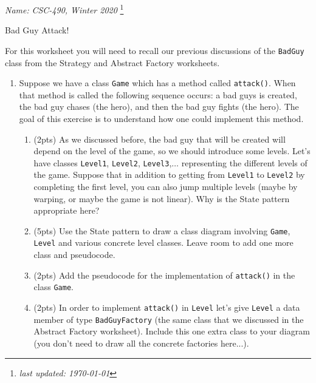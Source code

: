 \documentclass[11pt]{article}
\newlength{\up}\setlength{\up}{-\baselineskip}
\newcommand\blfootnote[1]{%
  \begingroup
  \renewcommand\thefootnote{}\footnote{#1}%
  \addtocounter{footnote}{-1}%
  \endgroup
}
\begin{document}
\noindent\emph{Name:}
\hfill
\emph{CSC-490, Winter 2020}
\blfootnote{\emph{last updated: \today}}

\vspace{-0.4in}

\begin{center}
  {\huge Bad Guy Attack!}
\end{center}

\medskip



For this worksheet you will need to recall our previous discussions of the \texttt{BadGuy} class from the Strategy and Abstract Factory worksheets. 

\begin{enumerate}

  \item Suppose we have a class \texttt{Game} which has a method called \texttt{attack()}. When that method is called the following sequence occurs: a bad guys is created, the bad guy chases (the hero), and then the bad guy fights (the hero). The goal of this exercise is to understand how one could implement this method.

  \begin{enumerate}

  \item (2pts) As we discussed before, the bad guy that will be created will depend on the level of the game, so we should introduce some levels. Let's have classes \texttt{Level1}, \texttt{Level2}, \texttt{Level3},$\ldots$ representing the different levels of the game. Suppose that in addition to getting from \texttt{Level1} to \texttt{Level2} by completing the first level, you can also jump multiple levels (maybe by warping, or maybe the game is not linear). Why is the State pattern appropriate here?

  \vspace{0.5in}

  \item (5pts) Use the State pattern to draw a class diagram involving \texttt{Game}, \texttt{Level} and various concrete level classes. Leave room to add one more class and pseudocode.

  \item (2pts) Add the pseudocode for the implementation of \texttt{attack()} in the class \texttt{Game}.

  \item (2pts) In order to implement \texttt{attack()} in \texttt{Level} let's give \texttt{Level} a data member of type \texttt{BadGuyFactory} (the same class that we discussed in the Abstract Factory worksheet). Include this one extra class to your diagram (you don't need to draw all the concrete factories here...). 


\end{enumerate}
\end{enumerate}
\end{document}
